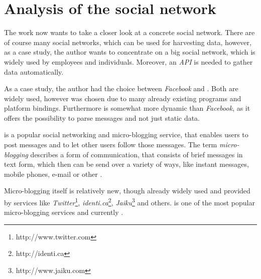 \chapter{Analysis of the social network \Twitter}
\label{chapter:analysis}

The work now wants to take a closer look at a concrete social network.
There are of course many social networks, which can be used for harvesting
data, however, as a case study, the author wants to concentrate on a big social
network, which is widely used by employees and individuals. Moreover,
an \textit{API} is needed to gather data automatically.

As a case study, the author had the choice between \textit{Facebook} and
\Twitter. Both are widely used, however \Twitter{} was chosen due to many
already existing programs and platform bindings. Furthermore \Twitter{} is
somewhat more dynamic than \textit{Facebook}, as it offers the possibility to
parse \Twitter{} messages and not just static data.

\Twitter{} is a popular social networking and micro-blogging service, that
enables users to post messages and to let other users follow those messages.
The term \textit{micro-blogging} describes a form of communication, that
consists of brief messages in text form, which then can be send over a variety
of ways, like instant messages, mobile phones, e-mail or other \cite{java2007}.

Micro-blogging itself is relatively new, though already widely used and
provided by services like
\textit{Twitter}\footnote{http://www.twitter.com},
\textit{identi.ca}\footnote{http://identi.ca},
\textit{Jaiku}\footnote{http://www.jaiku.com} and others. \Twitter{} is one of
the most popular micro-blogging services \cite{java2007} and currently .

